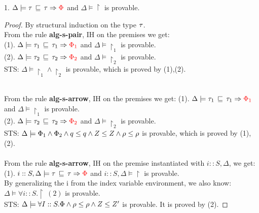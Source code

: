 \begin{lem}
1.  $ \Delta \models \tau \, \sqsubseteq \, \tau \Rightarrow \textcolor{red} {\Phi}$ and $ \Delta  \models \restriction$ is provable.
\end{lem}
\begin{proof}
By structural induction on the type $\tau$.\\
From the rule \textbf{alg-s-pair}, IH on the premises we get: \\
(1). $ \Delta \models \tau_1 \, \sqsubseteq \, \tau_1 \Rightarrow \textcolor{red} {\Phi_1}$ and $ \Delta  \models \restriction_1$ is provable. \\
(2). $ \Delta \models \tau_2 \, \sqsubseteq \, \tau_2 \Rightarrow \textcolor{red} {\Phi_2}$ and $ \Delta  \models \restriction_2$ is provable.\\
STS: $ \Delta  \models \restriction_1 \land \restriction_2 $ is provable, which is proved by  (1),(2). 

 \\ 
From the rule \textbf{alg-s-arrow}, IH on the premises we get: 
(1). $ \Delta \models \tau_1 \, \sqsubseteq \, \tau_1 \Rightarrow \textcolor{red} {\Phi_1}$ and $ \Delta  \models \restriction_1$ is provable. \\
(2). $ \Delta \models \tau_2 \, \sqsubseteq \, \tau_2 \Rightarrow \textcolor{red} {\Phi_2}$ and $ \Delta  \models \restriction_2$ is provable.\\
STS: $ \Delta  \models \Phi_1 \land \Phi_2 \land q \leq q
    \land Z \leq Z \land \rho \leq \rho $ is provable, which is proved by  (1),(2). \\
  
  \\  
From the rule \textbf{alg-s-arrow}, IH on the premise instantiated with $i::S, \Delta$, we get: \\
(1). $ i::S, \Delta \models \tau \, \sqsubseteq \, \tau \Rightarrow \textcolor{red} {\Phi}$ and $ i::S, \Delta  \models \restriction$ is provable. \\
By generalizing the i from the index variable environment, we also know: $\Delta \models \forall i::S. \restriction ~(2) $ is provable.\\
STS: $ \Delta  \models \forall I::S.\Phi
    \land \rho \leq \rho \land Z \leq Z'$ is provable. It is proved by (2).

\end{proof}

